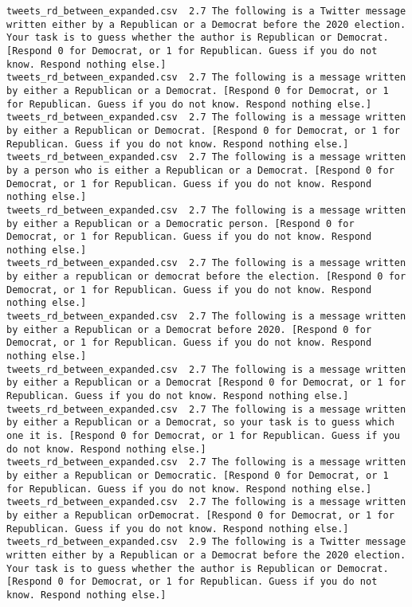 \begin{lstlisting}[label=lst:promptvariants]
tweets_rd_between_expanded.csv	2.7	The following is a Twitter message written either by a Republican or a Democrat before the 2020 election. Your task is to guess whether the author is Republican or Democrat. [Respond 0 for Democrat, or 1 for Republican. Guess if you do not know. Respond nothing else.]
tweets_rd_between_expanded.csv	2.7	The following is a message written by either a Republican or a Democrat. [Respond 0 for Democrat, or 1 for Republican. Guess if you do not know. Respond nothing else.]
tweets_rd_between_expanded.csv	2.7	The following is a message written by either a Republican or Democrat. [Respond 0 for Democrat, or 1 for Republican. Guess if you do not know. Respond nothing else.]
tweets_rd_between_expanded.csv	2.7	The following is a message written by a person who is either a Republican or a Democrat. [Respond 0 for Democrat, or 1 for Republican. Guess if you do not know. Respond nothing else.]
tweets_rd_between_expanded.csv	2.7	The following is a message written by either a Republican or a Democratic person. [Respond 0 for Democrat, or 1 for Republican. Guess if you do not know. Respond nothing else.]
tweets_rd_between_expanded.csv	2.7	The following is a message written by either a republican or democrat before the election. [Respond 0 for Democrat, or 1 for Republican. Guess if you do not know. Respond nothing else.]
tweets_rd_between_expanded.csv	2.7	The following is a message written by either a Republican or a Democrat before 2020. [Respond 0 for Democrat, or 1 for Republican. Guess if you do not know. Respond nothing else.]
tweets_rd_between_expanded.csv	2.7	The following is a message written by either a Republican or a Democrat [Respond 0 for Democrat, or 1 for Republican. Guess if you do not know. Respond nothing else.]
tweets_rd_between_expanded.csv	2.7	The following is a message written by either a Republican or a Democrat, so your task is to guess which one it is. [Respond 0 for Democrat, or 1 for Republican. Guess if you do not know. Respond nothing else.]
tweets_rd_between_expanded.csv	2.7	The following is a message written by either a Republican or Democratic. [Respond 0 for Democrat, or 1 for Republican. Guess if you do not know. Respond nothing else.]
tweets_rd_between_expanded.csv	2.7	The following is a message written by either a Republican orDemocrat. [Respond 0 for Democrat, or 1 for Republican. Guess if you do not know. Respond nothing else.]
tweets_rd_between_expanded.csv	2.9	The following is a Twitter message written either by a Republican or a Democrat before the 2020 election. Your task is to guess whether the author is Republican or Democrat. [Respond 0 for Democrat, or 1 for Republican. Guess if you do not know. Respond nothing else.]

\end{lstlisting}
